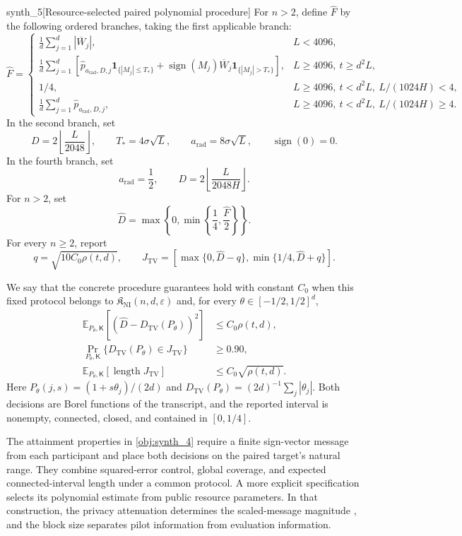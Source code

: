 \begin{definitionv}{synth_5}[Resource-selected paired polynomial procedure]
For \(n>2\), define \(\widehat F\) by the following ordered branches, taking the first applicable branch:
\[
\widehat F=
\begin{cases}
\displaystyle\frac1d\sum_{j=1}^d|\overline W_j|,
&L<4096,\\[6pt]
\displaystyle\frac1d\sum_{j=1}^d
\left[
\widehat p_{a_{\mathrm{rad}},D,j}
\mathbf1_{\{|M_j|\le T_*\}}
+\operatorname{sign}(M_j)\overline W_j
\mathbf1_{\{|M_j|>T_*\}}
\right],
&L\ge4096,\ t\ge d^2L,\\[6pt]
1/4,
&L\ge4096,\ t<d^2L,\ L/(1024H)<4,\\[4pt]
\displaystyle\frac1d\sum_{j=1}^d
\widehat p_{a_{\mathrm{rad}},D,j},
&L\ge4096,\ t<d^2L,\ L/(1024H)\ge4.
\end{cases}
\]
In the second branch, set
\[
D=2\left\lfloor\frac{L}{2048}\right\rfloor,
\qquad T_*=4\sigma\sqrt L,\qquad
a_{\mathrm{rad}}=8\sigma\sqrt L,
\qquad \operatorname{sign}(0)=0.
\]
In the fourth branch, set
\[
a_{\mathrm{rad}}=\frac12,
\qquad D=2\left\lfloor\frac{L}{2048H}\right\rfloor.
\]
For \(n>2\), set
\[
\widehat D=\max\left\{0,\min\left\{\frac14,\frac{\widehat F}{2}\right\}\right\}.
\]
For every \(n\ge2\), report
\[
q=\sqrt{10C_0\rho(t,d)},\qquad
J_{\mathrm{TV}}
=\left[
\max\{0,\widehat D-q\},
\min\{1/4,\widehat D+q\}
\right].
\]

We say that the concrete procedure guarantees hold with constant \(C_0\) when this fixed protocol belongs to \(\mathfrak K_{\mathrm{NI}}(n,d,\varepsilon)\) and, for every \(\theta\in[-1/2,1/2]^d\),
\[
\begin{aligned}
\mathbb E_{P_\theta,\mathsf K}
\left[(\widehat D-D_{\mathrm{TV}}(P_\theta))^2\right]
&\le C_0\rho(t,d),\\
\Pr_{P_\theta,\mathsf K}
\{D_{\mathrm{TV}}(P_\theta)\in J_{\mathrm{TV}}\}
&\ge0.90,\\
\mathbb E_{P_\theta,\mathsf K}
\left[\operatorname{length}J_{\mathrm{TV}}\right]
&\le C_0\sqrt{\rho(t,d)}.
\end{aligned}
\]
Here \(P_\theta(j,s)=(1+s\theta_j)/(2d)\) and
\(D_{\mathrm{TV}}(P_\theta)=(2d)^{-1}\sum_j|\theta_j|\).
Both decisions are Borel functions of the transcript, and the reported interval is nonempty, connected, closed, and contained in \([0,1/4]\).
\end{definitionv}

The attainment properties in \cref{obj:synth_4} require a finite sign-vector message from each participant and place both decisions on the paired target's natural range. They combine squared-error control, global coverage, and expected connected-interval length under a common protocol. A more explicit specification selects its polynomial estimate from public resource parameters. In that construction, the privacy attenuation  determines the scaled-message magnitude , and the block size  separates pilot information from evaluation information.

